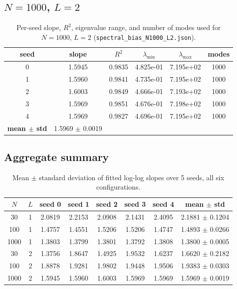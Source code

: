 \subsection{$N=1000$, $L=2$}
\begin{table}[H]
\centering
\caption{Per-seed slope, $R^2$, eigenvalue range, and number of modes used for $N=1000$, $L=2$ (\texttt{spectral\_bias\_N1000\_L2.json}).}
\label{tab:slopeA-N1000-L2}
\begin{tabular}{c c c c c c}
\toprule
seed & slope & $R^2$ & $\lambda_{\min}$ & $\lambda_{\max}$ & modes \\
\midrule
0 & 1.5945 & 0.9835 & 4.825e-01 & 7.195e+02 & 1000 \\
1 & 1.5960 & 0.9841 & 4.735e-01 & 7.195e+02 & 1000 \\
2 & 1.6003 & 0.9849 & 4.666e-01 & 7.193e+02 & 1000 \\
3 & 1.5969 & 0.9851 & 4.676e-01 & 7.198e+02 & 1000 \\
4 & 1.5969 & 0.9827 & 4.696e-01 & 7.195e+02 & 1000 \\
\midrule
\textbf{mean $\pm$ std} & 1.5969 $\pm$ 0.0019 & \multicolumn{4}{l}{} \\
\bottomrule
\end{tabular}
\end{table}

\subsection*{Aggregate summary}
\begin{table}[H]
\centering
\caption{Mean $\pm$ standard deviation of fitted log-log slopes over 5 seeds, all six configurations.}
\label{tab:slope-aggregate}
\begin{tabular}{c c c c c c c c}
\toprule
$N$ & $L$ & seed 0 & seed 1 & seed 2 & seed 3 & seed 4 & mean $\pm$ std \\
\midrule
30 & 1 & 2.0819 & 2.2153 & 2.0908 & 2.1431 & 2.4095 & 2.1881 $\pm$ 0.1204 \\
100 & 1 & 1.4757 & 1.4551 & 1.5206 & 1.5206 & 1.4747 & 1.4893 $\pm$ 0.0266 \\
1000 & 1 & 1.3803 & 1.3799 & 1.3801 & 1.3792 & 1.3808 & 1.3800 $\pm$ 0.0005 \\
30 & 2 & 1.3756 & 1.8647 & 1.4925 & 1.9532 & 1.6237 & 1.6620 $\pm$ 0.2182 \\
100 & 2 & 1.8878 & 1.9281 & 1.9802 & 1.9448 & 1.9506 & 1.9383 $\pm$ 0.0303 \\
1000 & 2 & 1.5945 & 1.5960 & 1.6003 & 1.5969 & 1.5969 & 1.5969 $\pm$ 0.0019 \\
\bottomrule
\end{tabular}
\end{table}
